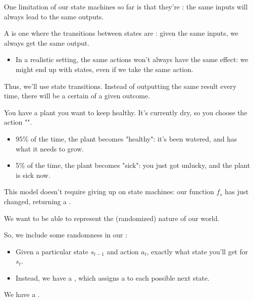         One limitation of our state machines so far is that they're : the same inputs will always lead to the same outputs.\\

        \begin{definition}
            A  is one where the transitions between states are : given the same inputs, we always get the same output.
        \end{definition}

        \begin{itemize}
            \item In a realistic setting, the same actions won't always have the same effect: we might end up with  states, even if we take the same action.
        \end{itemize}

        Thus, we'll use  state transitions. Instead of outputting the same result every time, there will be a certain  of a given outcome.

        \miniex You have a plant you want to keep healthy. It's currently dry, so you choose the action "".

        \begin{itemize}
            \item 95\% of the time, the plant becomes "healthy": it's been watered, and has what it needs to grow.
            \item 5\% of the time, the plant becomes "sick": you just got unlucky, and the plant is sick now. 
        \end{itemize}

        This model doesn't require giving up on state machines: our function $f_s$ has just changed, returning a .\\

        \begin{concept}
            We want to be able to represent the  (randomized) nature of our world.

            So, we include some randomness in our : 

            \begin{itemize}
                \item Given a particular state $s_{t-1}$ and action $a_t$,  exactly what state you'll get for $s_t$.
                \item Instead, we have a , which assigns a  to each possible next state.
            \end{itemize}

            We have a .
        \end{concept}

